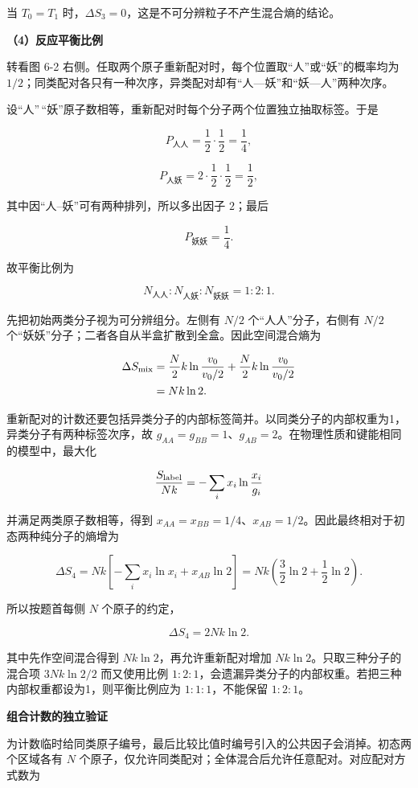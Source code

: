 \documentclass[12pt,a4paper,UTF8]{ctexart}
\begin{document}
当 \(T_0=T_1\)
时，\(\Delta S_3=0\)，这是不可分辨粒子不产生混合熵的结论。

\textbf{（4）反应平衡比例}

转看图 6-2
右侧。任取两个原子重新配对时，每个位置取``人''或``妖''的概率均为
\(1/2\)；同类配对各只有一种次序，异类配对却有``人---妖''和``妖---人''两种次序。

设``人''\,``妖''原子数相等，重新配对时每个分子两个位置独立抽取标签。于是

\[P_{\text{人人}}=\frac12\cdot\frac12=\frac14,\]

\[P_{\text{人妖}}=2\cdot\frac12\cdot\frac12=\frac12,\]

其中因``人--妖''可有两种排列，所以多出因子 \(2\)；最后

\[P_{\text{妖妖}}=\frac14.\]

故平衡比例为

\[\boxed{N_{\text{人人}}:N_{\text{人妖}}:N_{\text{妖妖}}=1:2:1}.\]

先把初始两类分子视为可分辨组分。左侧有 \(N/2\) 个``人人''分子，右侧有
\(N/2\) 个``妖妖''分子；二者各自从半盒扩散到全盒。因此空间混合熵为

\[
\begin{aligned}
\Delta S_{\rm mix}
&=\frac N2k\ln\frac{v_0}{v_0/2}
+\frac N2k\ln\frac{v_0}{v_0/2}\\
&=Nk\ln2.
\end{aligned}
\]

重新配对的计数还要包括异类分子的内部标签简并。以同类分子的内部权重为1，异类分子有两种标签次序，故
\(g_{AA}=g_{BB}=1\)、\(g_{AB}=2\)。在物理性质和键能相同的模型中，最大化

\[\frac{S_{\rm label}}{Nk}
=-\sum_i x_i\ln\frac{x_i}{g_i}\]

并满足两类原子数相等，得到
\(x_{AA}=x_{BB}=1/4\)、\(x_{AB}=1/2\)。因此最终相对于初态两种纯分子的熵增为

\[\Delta S_4=Nk\left[-\sum_i x_i\ln x_i+x_{AB}\ln2\right]
=Nk\left(\frac32\ln2+\frac12\ln2\right).\]

所以按题首每侧 \(N\) 个原子的约定，

\[\boxed{\Delta S_4=2Nk\ln2.}\]

其中先作空间混合得到 \(Nk\ln2\)，再允许重新配对增加
\(Nk\ln2\)。只取三种分子的混合项 \(3Nk\ln2/2\) 而又使用比例
\(1:2:1\)，会遗漏异类分子的内部权重。若把三种内部权重都设为1，则平衡比例应为
\(1:1:1\)，不能保留 \(1:2:1\)。

\textbf{组合计数的独立验证}

为计数临时给同类原子编号，最后比较比值时编号引入的公共因子会消掉。初态两个区域各有
\(N\) 个原子，仅允许同类配对；全体混合后允许任意配对。对应配对方式数为
\end{document}
